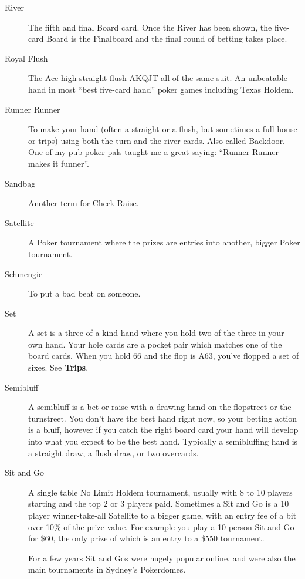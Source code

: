 \begin{description}
\item[River] The fifth and final Board card. Once the River has been
shown, the five-card Board is the Finalboard and the final round of
betting takes place.

\item[Royal Flush] The Ace-high straight flush AKQJT all of the same
suit. An unbeatable hand in most ``best five-card hand'' poker games
including Texas Holdem.

\item[Runner Runner] To make your hand (often a straight or a flush,
but sometimes a full house or trips) using both the turn and the
river cards. Also called Backdoor. One of my pub poker pals taught me
a great saying: ``Runner-Runner makes it funner''.

\item[Sandbag] Another term for Check-Raise.

\item[Satellite] A Poker tournament where the prizes are entries into
another, bigger Poker tournament.

\item[Schmengie] To put a bad beat on someone.

\item[Set] A set is a three of a kind hand where you hold two of the
three in your own hand. Your hole cards are a pocket pair which
matches one of the board cards. When you hold 66 and the flop is A63,
you've flopped a set of sixes. See \textbf{Trips}.

\item[Semibluff] A semibluff is a bet or raise with a drawing hand on
the flopstreet or the turnstreet. You don't have the best hand right
now, so your betting action is a bluff, however if you catch the right
board card your hand will develop into what you expect to be the best
hand. Typically a semibluffing hand is a straight draw, a flush draw,
or two overcards.

\item[Sit and Go] A single table No Limit Holdem tournament, usually
with 8 to 10 players starting and the top 2 or 3 players
paid. Sometimes a Sit and Go is a 10 player winner-take-all
Satellite to a bigger game, with an entry fee of a
bit over 10\% of the prize value. For example you play a 10-person
Sit and Go for \$60, the only prize of which is an entry to a \$550
tournament.

For a few years Sit and Gos were hugely popular online, and were also
the main tournaments in Sydney's Pokerdomes.


\end{description}
